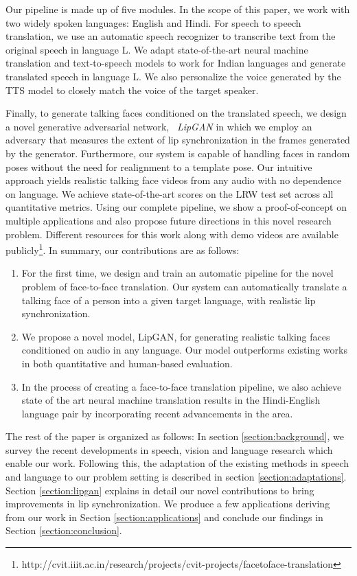 \documentclass[sigconf]{acmart}
\begin{document}
Our pipeline is made up of five modules. In the scope of this paper, we work with two widely spoken languages: English and Hindi. For speech to speech translation, we use an automatic speech recognizer\cite{amodei2016deep} to transcribe text from the original speech in language L. We adapt state-of-the-art neural machine translation and text-to-speech models\cite{vaswani2017attention,ping2017deep} to work for Indian languages and generate translated speech in language L. We also personalize the voice\cite{kaneko2017parallel} generated by the TTS model to closely match the voice of the target speaker. 

Finally, to generate talking faces conditioned on the translated speech, we design a novel generative adversarial network, ~\textit{LipGAN} in which we employ an adversary that measures the extent of lip synchronization in the frames generated by the generator. Furthermore, our system is capable of handling faces in random poses without the need for realignment to a template pose. Our intuitive approach yields realistic talking face videos from any audio with no dependence on language. We achieve state-of-the-art scores on the LRW test set across all quantitative metrics. Using our complete pipeline, we show a proof-of-concept on multiple applications and also propose future directions in this novel research problem. Different resources for this work along with demo videos are available publicly\footnote{http://cvit.iiit.ac.in/research/projects/cvit-projects/facetoface-translation}. In summary, our contributions are as follows:
\begin{enumerate}
    \item For the first time, we design and train an automatic pipeline for the novel problem of face-to-face translation. Our system can automatically translate a talking face of a person into a given target language, with realistic lip synchronization.
    \item We propose a novel model, LipGAN, for generating realistic talking faces conditioned on audio in any language. Our model outperforms existing works in both quantitative and human-based evaluation. 
    \item In the process of creating a face-to-face translation pipeline, we also achieve state of the art neural machine translation results in the Hindi-English language pair by incorporating recent advancements in the area.
\end{enumerate}

The rest of the paper is organized as follows: In section \ref{section:background}, we survey the recent developments in speech, vision and language research which enable our work. Following this, the adaptation of the existing methods in speech and language to our problem setting is described in section \ref{section:adaptations}. Section \ref{section:lipgan} explains in detail our novel contributions to bring improvements in lip synchronization. We produce a few applications deriving from our work in Section \ref{section:applications} and conclude our findings in Section \ref{section:conclusion}. 
\end{document}
